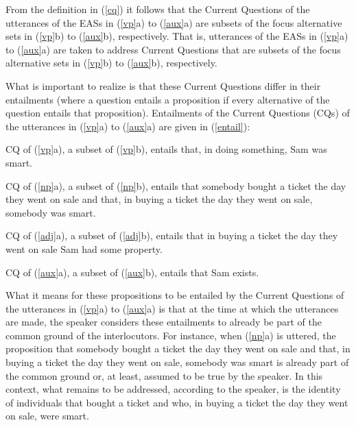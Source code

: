 \documentclass[11pt,fleqn]{article}
\newcommand{\6}{\mbox{$[\hspace*{-.6mm}[$}}
\newcommand{\9}{\mbox{$]\hspace*{-.6mm}]$}}
\begin{document}
From the definition in (\ref{cq}) it follows that the Current Questions of the utterances of the EASs in (\ref{vp}a) to (\ref{aux}a) are subsets of the focus alternative sets in (\ref{vp}b) to (\ref{aux}b), respectively. That is, utterances of the EASs in (\ref{vp}a) to (\ref{aux}a) are taken to address Current Questions that are subsets of the focus alternative sets in (\ref{vp}b) to (\ref{aux}b), respectively.

What is important to realize is that these Current Questions differ in their entailments (where a question entails a proposition if every alternative of the question entails that proposition). Entailments of the Current Questions (CQs) of the utterances in (\ref{vp}a) to (\ref{aux}a) are given in (\ref{entail}):

\begin{exe}
\ex\label{entail}

\begin{xlist}

\ex CQ of (\ref{vp}a), a subset of (\ref{vp}b), entails that, in doing something, Sam was smart.

\ex CQ of (\ref{np}a), a subset of (\ref{np}b), entails that somebody bought a ticket the day they went on sale and that, in buying a ticket the day they went on sale, somebody was smart.

\ex CQ of (\ref{adj}a), a subset of (\ref{adj}b), entails that in buying a ticket the day they went on sale Sam had some property.

\ex CQ of (\ref{aux}a), a subset of (\ref{aux}b), entails that Sam exists.

\end{xlist}

\end{exe}
What it means for these propositions to be entailed by the Current Questions of the utterances in (\ref{vp}a) to (\ref{aux}a) is that at the time at which the utterances are made, the speaker considers these entailments to already be part of the common ground of the interlocutors. For instance, when (\ref{np}a) is uttered, the proposition that somebody bought a ticket the day they went on sale and that, in buying a ticket the day they went on sale, somebody was smart is already part of the common ground or, at least, assumed to be true by the speaker. In this context, what remains to be addressed, according to the speaker, is the identity of individuals that bought a ticket and who, in buying a ticket the day they went on sale, were smart.
\end{document}
